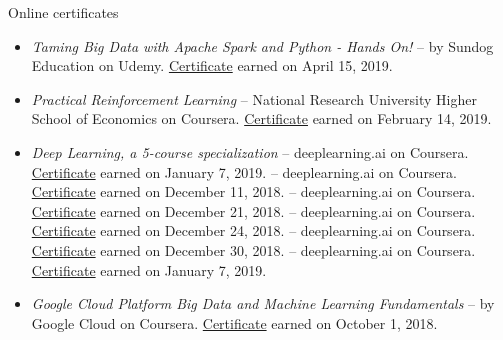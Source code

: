 \begin{rSection}{Online certificates}
  \begin{itemize}
    \item{\it Taming Big Data with Apache Spark and Python - Hands On!} -- by Sundog Education on Udemy. \href{https://www.udemy.com/certificate/UC-G53DWS5V/}{Certificate} earned on April 15, 2019.
    \item {\it Practical Reinforcement Learning} -- National Research University Higher School of Economics on Coursera. \href{https://coursera.org/share/7dbaef1de4f13d7016316a4dd7eece8a}{Certificate} earned on February 14, 2019.
    \item{\it Deep Learning, a 5-course specialization} -- deeplearning.ai on Coursera. \href{https://coursera.org/share/47b1d9ff10e34c9d26c75f5f0914379b}{Certificate} earned on January 7, 2019.
     -- deeplearning.ai on Coursera. \href{https://coursera.org/share/b99cfdbf684af876690916f62a41f74d}{Certificate} earned on December 11, 2018.
     -- deeplearning.ai on Coursera. \href{https://coursera.org/share/70436cea6ad8695c56da96f285739488}{Certificate} earned on December 21, 2018.
     -- deeplearning.ai on Coursera. \href{https://coursera.org/share/b4fec0b5c8ada28277e0369aced10c34}{Certificate} earned on December 24, 2018.
     -- deeplearning.ai on Coursera. \href{https://coursera.org/share/efaf45dddda63778f97da9aafaaa71b0}{Certificate} earned on December 30, 2018.
     -- deeplearning.ai on Coursera. \href{https://coursera.org/share/aeb503aafcd63fd9b1e098c232c6cfa4}{Certificate} earned on January 7, 2019.
    \item {\it Google Cloud Platform Big Data and Machine Learning Fundamentals} -- by Google Cloud on Coursera. \href{https://coursera.org/share/469ce1832e0392458bc6930beb44d8c6}{Certificate} earned on October 1, 2018.
  \end{itemize}
\end{rSection}

